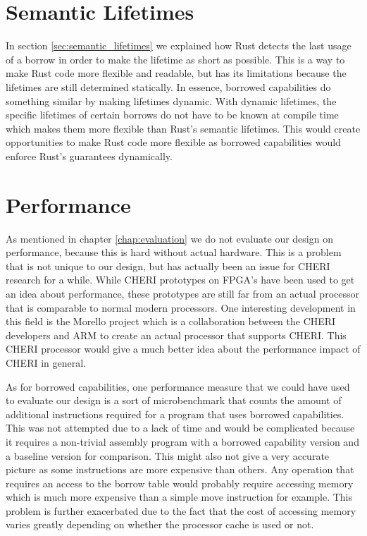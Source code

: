 \section{Semantic Lifetimes}
In section \ref{sec:semantic_lifetimes} we explained how Rust detects the last usage of a borrow in order to make the lifetime as short as possible.
This is a way to make Rust code more flexible and readable, but has its limitations because the lifetimes are still determined statically.
In essence, borrowed capabilities do something similar by making lifetimes dynamic.
With dynamic lifetimes, the specific lifetimes of certain borrows do not have to be known at compile time which makes them more flexible than Rust's semantic lifetimes.
This would create opportunities to make Rust code more flexible as borrowed capabilities would enforce Rust's guarantees dynamically.

\section{Performance}
As mentioned in chapter \ref{chap:evaluation} we do not evaluate our design on performance, because this is hard without actual hardware.
This is a problem that is not unique to our design, but has actually been an issue for CHERI research for a while.
While CHERI prototypes on FPGA's have been used to get an idea about performance, these prototypes are still far from an actual processor that is comparable to normal modern processors.
One interesting development in this field is the Morello project which is a collaboration between the CHERI developers and ARM to create an actual processor that supports CHERI.
This CHERI processor would give a much better idea about the performance impact of CHERI in general.

As for borrowed capabilities, one performance measure that we could have used to evaluate our design is a sort of microbenchmark that counts the amount of additional instructions required for a program that uses borrowed capabilities.
This was not attempted due to a lack of time and would be complicated because it requires a non-trivial assembly program with a borrowed capability version and a baseline version for comparison.
This might also not give a very accurate picture as some instructions are more expensive than others.
Any operation that requires an access to the borrow table would probably require accessing memory which is much more expensive than a simple move instruction for example.
This problem is further exacerbated due to the fact that the cost of accessing memory varies greatly depending on whether the processor cache is used or not.

